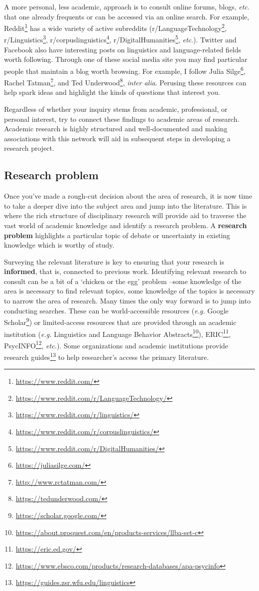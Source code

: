 \documentclass[
  letterpaper,
  DIV=11,
  numbers=noendperiod]{scrreport}
\theoremstyle{definition}
\theoremstyle{remark}
\DeclareRobustCommand{\href}[2]{#2\footnote{\url{#1}}}
\begin{document}
A more personal, less academic, approach is to consult online forums,
blogs, \emph{etc}. that one already frequents or can be accessed via an
online search. For example, \href{https://www.reddit.com/}{Reddit} has a
wide variety of active subreddits
(\href{https://www.reddit.com/r/LanguageTechnology/}{r/LanguageTechnology},
\href{https://www.reddit.com/r/linguistics/}{r/Linguistics},
\href{https://www.reddit.com/r/corpuslinguistics/}{r/corpuslinguistics},
\href{https://www.reddit.com/r/DigitalHumanities/}{r/DigitalHumanities},
\emph{etc}.). Twitter and Facebook also have interesting posts on
linguistics and language-related fields worth following. Through one of
these social media site you may find particular people that maintain a
blog worth browsing. For example, I follow
\href{https://juliasilge.com/}{Julia Silge},
\href{http://www.rctatman.com/}{Rachel Tatman}, and
\href{https://tedunderwood.com/}{Ted Underwood}, \emph{inter alia}.
Perusing these resources can help spark ideas and highlight the kinds of
questions that interest you.

Regardless of whether your inquiry stems from academic, professional, or
personal interest, try to connect these findings to academic areas of
research. Academic research is highly structured and well-documented and
making associations with this network will aid in subsequent steps in
developing a research project.

\hypertarget{sec-fr-problem}{%
\subsection{Research problem}\label{sec-fr-problem}}

Once you've made a rough-cut decision about the area of research, it is
now time to take a deeper dive into the subject area and jump into the
literature. This is where the rich structure of disciplinary research
will provide aid to traverse the vast world of academic knowledge and
identify a research problem. A \textbf{research problem} highlights a
particular topic of debate or uncertainty in existing knowledge which is
worthy of study.

Surveying the relevant literature is key to ensuring that your research
is \textbf{informed}, that is, connected to previous work. Identifying
relevant research to consult can be a bit of a `chicken or the egg'
problem --some knowledge of the area is necessary to find relevant
topics, some knowledge of the topics is necessary to narrow the area of
research. Many times the only way forward is to jump into conducting
searches. These can be world-accessible resources (\emph{e.g.}
\href{https://scholar.google.com/}{Google Scholar}) or limited-access
resources that are provided through an academic institution (\emph{e.g.}
\href{https://about.proquest.com/en/products-services/llba-set-c}{Linguistics
and Language Behavior Abstracts}), \href{https://eric.ed.gov/}{ERIC},
\href{https://www.ebsco.com/products/research-databases/apa-psycinfo}{PsycINFO},
\emph{etc.}). Some organizations and academic institutions provide
\href{https://guides.zsr.wfu.edu/linguistics}{research guides} to help
researcher's access the primary literature.
\end{document}
